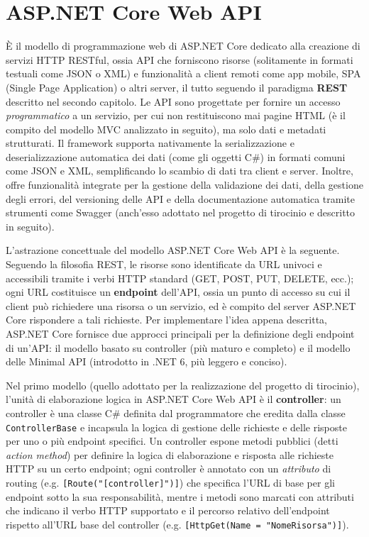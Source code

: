 \section{ASP.NET Core Web API}
È il modello di programmazione web di ASP.NET Core dedicato alla creazione di servizi HTTP RESTful, ossia API che forniscono risorse (solitamente in formati testuali come JSON o XML) e funzionalità a client remoti come app mobile, SPA (Single Page Application) o altri server, il tutto seguendo il paradigma \textbf{REST} descritto nel secondo capitolo. Le API sono progettate per fornire un accesso \emph{programmatico} a un servizio, per cui non restituiscono mai pagine HTML (è il compito del modello MVC analizzato in seguito), ma solo dati e metadati strutturati.
Il framework supporta nativamente la serializzazione e deserializzazione automatica dei dati (come gli oggetti C\#) in formati comuni come JSON e XML, semplificando lo scambio di dati tra client e server. Inoltre, offre funzionalità integrate per la gestione della validazione dei dati, della gestione degli errori, del versioning delle API e della documentazione automatica tramite strumenti come Swagger (anch'esso adottato nel progetto di tirocinio e descritto in seguito).

L'astrazione concettuale del modello ASP.NET Core Web API è la seguente. Seguendo la filosofia REST, le risorse sono identificate da URL univoci e accessibili tramite i verbi HTTP standard (GET, POST, PUT, DELETE, ecc.); ogni URL costituisce un \textbf{endpoint} dell'API, ossia un punto di accesso su cui il client può richiedere una risorsa o un servizio, ed è compito del server ASP.NET Core rispondere a tali richieste. \cite[p.47]{Pro_ASP.NET}
Per implementare l'idea appena descritta, ASP.NET Core fornisce due approcci principali per la definizione degli endpoint di un'API: il modello basato su controller (più maturo e completo) e il modello delle Minimal API (introdotto in .NET 6, più leggero e conciso).

Nel primo modello (quello adottato per la realizzazione del progetto di tirocinio), l'unità di elaborazione logica in ASP.NET Core Web API è il \textbf{controller}: un controller è una classe C\# definita dal programmatore che eredita dalla classe \texttt{ControllerBase} e incapsula la logica di gestione delle richieste e delle risposte per uno o più endpoint specifici.
Un controller espone metodi pubblici (detti \emph{action method}) per definire la logica di elaborazione e risposta alle richieste HTTP su un certo endpoint; ogni controller è annotato con un \emph{attributo} di routing (e.g. \texttt{[Route("[controller]")]}) che specifica l'URL di base per gli endpoint sotto la sua responsabilità, mentre i metodi sono marcati con attributi che indicano il verbo HTTP supportato e il percorso relativo dell'endpoint rispetto all'URL base del controller (e.g. \texttt{[HttpGet(Name = "NomeRisorsa")]}).

